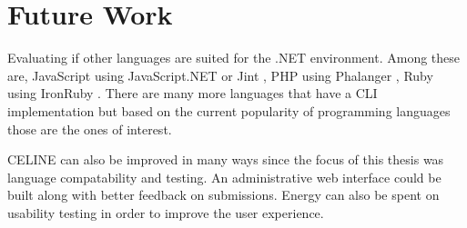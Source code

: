 \section{Future Work}

Evaluating if other languages are suited for the .NET environment. Among these are, JavaScript using JavaScript.NET \cite{JavaScript.NET} or Jint \cite{Jint}, PHP using Phalanger \cite{Phalanger}, Ruby using IronRuby \cite{IronRuby}. There are many more languages that have a CLI implementation but based on the current popularity of programming languages \cite{Tiobe} those are the ones of interest.

CELINE can also be improved in many ways since the focus of this thesis was language compatability and testing. An administrative web interface could be built along with better feedback on submissions. Energy can also be spent on usability testing in order to improve the user experience.